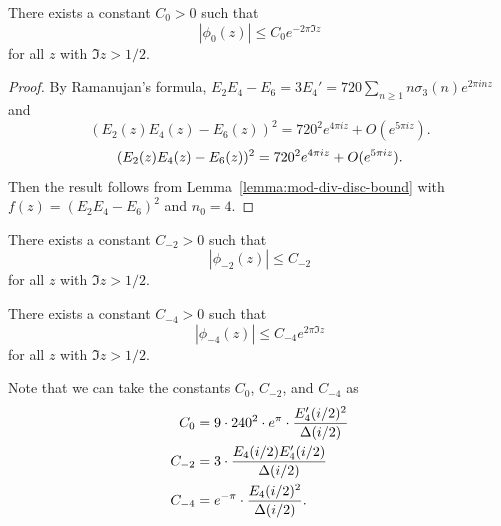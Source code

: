 \begin{corollary}\label{cor:phi0-bound}
There exists a constant $C_0 > 0$ such that
\begin{equation}\label{eqn:phi0-bound}
|\phi_0(z)| \le C_0 e^{-2 \pi \Im z}
\end{equation}
for all $z$ with $\Im z > 1/2$.
\end{corollary}
\begin{proof}
By Ramanujan's formula, $E_2 E_4 - E_6 = 3E_4' = 720 \sum_{n \ge 1} n \sigma_3(n) e^{2 \pi i n z}$ and
\ifplastex
\begin{equation*}
    (E_2(z) E_4(z) - E_6(z))^{2} = 720^{2} e^{4 \pi i z} + O(e^{5 \pi i z}).
\end{equation*}
\else
\begin{equation}
    (E_2(z) E_4(z) - E_6(z))^{2} = 720^{2} e^{4 \pi i z} + O(e^{5 \pi i z}). \notag
\end{equation}
\fi
Then the result follows from Lemma~\ref{lemma:mod-div-disc-bound} with $f(z) = (E_2 E_4 - E_6)^2$ and $n_0 = 4$.
\end{proof}

\begin{corollary}\label{cor:phi2-bound}
There exists a constant $C_{-2} > 0$ such that
\begin{equation}\label{eqn:phi2-bound}
    |\phi_{-2}(z)| \le C_{-2}
\end{equation}
for all $z$ with $\Im z > 1/2$.
\end{corollary}

\begin{corollary}\label{cor:phi4-bound}
There exists a constant $C_{-4} > 0$ such that
\begin{equation}\label{eqn:phi4-bound}
    |\phi_{-4}(z)| \le C_{-4} e^{2 \pi \Im z}
\end{equation}
for all $z$ with $\Im z > 1/2$.
\end{corollary}

Note that we can take the constants $C_0$, $C_{-2}$, and $C_{-4}$ as
\begin{align}
    C_0 &= 9 \cdot 240^2 \cdot e^{\pi} \cdot \frac{E_4'(i/2)^{2}}{\Delta(i/2)} \notag \\
    C_{-2} &= 3 \cdot \frac{E_4(i/2) E_4'(i/2)}{\Delta(i/2)} \notag \\
    C_{-4} &= e^{-\pi} \cdot \frac{E_4(i/2)^{2}}{\Delta(i/2)}. \notag
\end{align}

